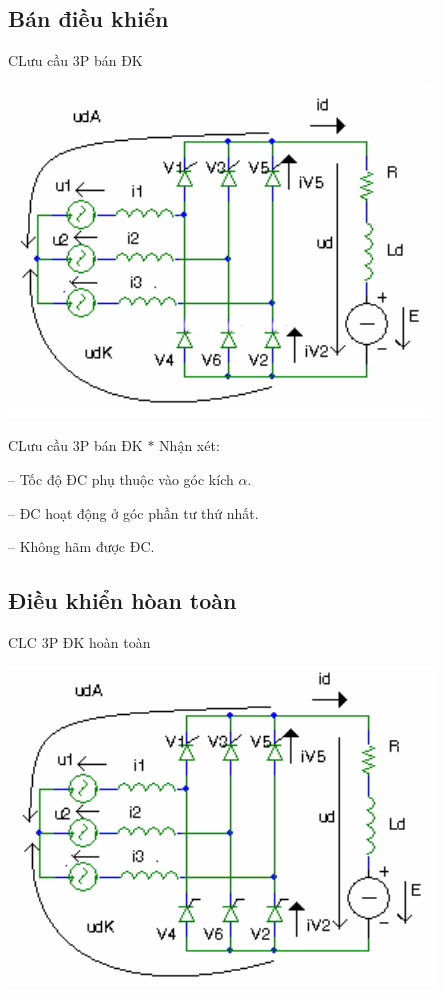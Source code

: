 \documentclass[24pt]{beamer}
\begin{document}
\subsection*{Bán điều khiển}
\begin{frame}{CLưu cầu 3P bán ĐK}
	\begin{center}
		\vspace{-.3cm}
		\includegraphics[scale=.55]{images-chude6/chinh-luu-cau-3pha-ban-dieu-khien.png} 
	\end{center}
\end{frame}

\begin{frame}{CLưu cầu 3P bán ĐK}
	\justifying
	$\ast$ Nhận xét:
	
	-- Tốc độ ĐC phụ thuộc vào góc kích $\alpha$.
	
	-- ĐC hoạt động ở góc phần tư thứ nhất.	

	-- Không  hãm được ĐC.
\end{frame}

\subsection*{Điều khiển hòan toàn}
\begin{frame}{CLC 3P ĐK hoàn toàn}
	\begin{center}
		\vspace{-.3cm}
		\includegraphics[scale=.55]{images-chude6/chinh-luu-cau-3pha-dieu-khien-hoan-toan.png} 
	\end{center}
\end{frame}
\end{document}
